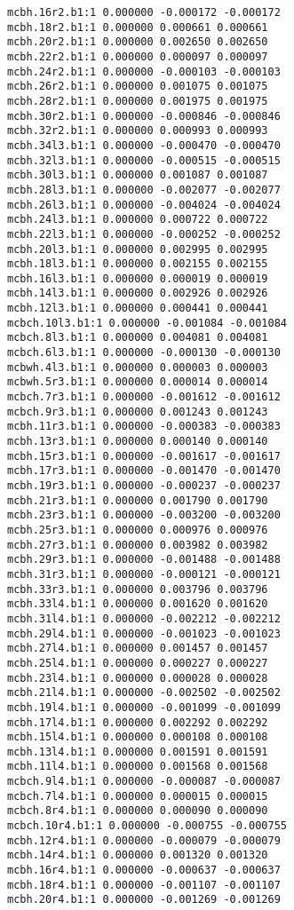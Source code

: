 \begin{verbatim}
mcbh.16r2.b1:1 0.000000 -0.000172 -0.000172
mcbh.18r2.b1:1 0.000000 0.000661 0.000661
mcbh.20r2.b1:1 0.000000 0.002650 0.002650
mcbh.22r2.b1:1 0.000000 0.000097 0.000097
mcbh.24r2.b1:1 0.000000 -0.000103 -0.000103
mcbh.26r2.b1:1 0.000000 0.001075 0.001075
mcbh.28r2.b1:1 0.000000 0.001975 0.001975
mcbh.30r2.b1:1 0.000000 -0.000846 -0.000846
mcbh.32r2.b1:1 0.000000 0.000993 0.000993
mcbh.34l3.b1:1 0.000000 -0.000470 -0.000470
mcbh.32l3.b1:1 0.000000 -0.000515 -0.000515
mcbh.30l3.b1:1 0.000000 0.001087 0.001087
mcbh.28l3.b1:1 0.000000 -0.002077 -0.002077
mcbh.26l3.b1:1 0.000000 -0.004024 -0.004024
mcbh.24l3.b1:1 0.000000 0.000722 0.000722
mcbh.22l3.b1:1 0.000000 -0.000252 -0.000252
mcbh.20l3.b1:1 0.000000 0.002995 0.002995
mcbh.18l3.b1:1 0.000000 0.002155 0.002155
mcbh.16l3.b1:1 0.000000 0.000019 0.000019
mcbh.14l3.b1:1 0.000000 0.002926 0.002926
mcbh.12l3.b1:1 0.000000 0.000441 0.000441
mcbch.10l3.b1:1 0.000000 -0.001084 -0.001084
mcbch.8l3.b1:1 0.000000 0.004081 0.004081
mcbch.6l3.b1:1 0.000000 -0.000130 -0.000130
mcbwh.4l3.b1:1 0.000000 0.000003 0.000003
mcbwh.5r3.b1:1 0.000000 0.000014 0.000014
mcbch.7r3.b1:1 0.000000 -0.001612 -0.001612
mcbch.9r3.b1:1 0.000000 0.001243 0.001243
mcbh.11r3.b1:1 0.000000 -0.000383 -0.000383
mcbh.13r3.b1:1 0.000000 0.000140 0.000140
mcbh.15r3.b1:1 0.000000 -0.001617 -0.001617
mcbh.17r3.b1:1 0.000000 -0.001470 -0.001470
mcbh.19r3.b1:1 0.000000 -0.000237 -0.000237
mcbh.21r3.b1:1 0.000000 0.001790 0.001790
mcbh.23r3.b1:1 0.000000 -0.003200 -0.003200
mcbh.25r3.b1:1 0.000000 0.000976 0.000976
mcbh.27r3.b1:1 0.000000 0.003982 0.003982
mcbh.29r3.b1:1 0.000000 -0.001488 -0.001488
mcbh.31r3.b1:1 0.000000 -0.000121 -0.000121
mcbh.33r3.b1:1 0.000000 0.003796 0.003796
mcbh.33l4.b1:1 0.000000 0.001620 0.001620
mcbh.31l4.b1:1 0.000000 -0.002212 -0.002212
mcbh.29l4.b1:1 0.000000 -0.001023 -0.001023
mcbh.27l4.b1:1 0.000000 0.001457 0.001457
mcbh.25l4.b1:1 0.000000 0.000227 0.000227
mcbh.23l4.b1:1 0.000000 0.000028 0.000028
mcbh.21l4.b1:1 0.000000 -0.002502 -0.002502
mcbh.19l4.b1:1 0.000000 -0.001099 -0.001099
mcbh.17l4.b1:1 0.000000 0.002292 0.002292
mcbh.15l4.b1:1 0.000000 0.000108 0.000108
mcbh.13l4.b1:1 0.000000 0.001591 0.001591
mcbh.11l4.b1:1 0.000000 0.001568 0.001568
mcbch.9l4.b1:1 0.000000 -0.000087 -0.000087
mcbch.7l4.b1:1 0.000000 0.000015 0.000015
mcbch.8r4.b1:1 0.000000 0.000090 0.000090
mcbch.10r4.b1:1 0.000000 -0.000755 -0.000755
mcbh.12r4.b1:1 0.000000 -0.000079 -0.000079
mcbh.14r4.b1:1 0.000000 0.001320 0.001320
mcbh.16r4.b1:1 0.000000 -0.000637 -0.000637
mcbh.18r4.b1:1 0.000000 -0.001107 -0.001107
mcbh.20r4.b1:1 0.000000 -0.001269 -0.001269

\end{verbatim}
